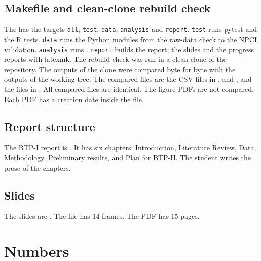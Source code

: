 \documentclass[11pt,a4paper]{article}
\begin{document}
\subsection{Makefile and clean-clone rebuild check}
The  has the targets \texttt{all}, \texttt{test}, \texttt{data}, \texttt{analysis} and \texttt{report}. \texttt{test} runs pytest and the R tests. \texttt{data} runs the Python modules from the raw-data check to the NPCI validation. \texttt{analysis} runs . \texttt{report} builds the report, the slides and the progress reports with latexmk.
The rebuild check was run in a clean clone of the repository. The outputs of the clone were compared byte for byte with the outputs of the working tree. The compared files are the CSV files in ,  and , and the files in . All compared files are identical. The figure PDFs are not compared. Each PDF has a creation date inside the file.

\subsection{Report structure}
The BTP-I report is . It has six chapters: Introduction, Literature Review, Data, Methodology, Preliminary results, and Plan for BTP-II. The student writes the prose of the chapters.

\subsection{Slides}
The slides are . The file has 14 frames.
The PDF has 15 pages.

\section{Numbers}\label{sec:numbers}
\end{document}

